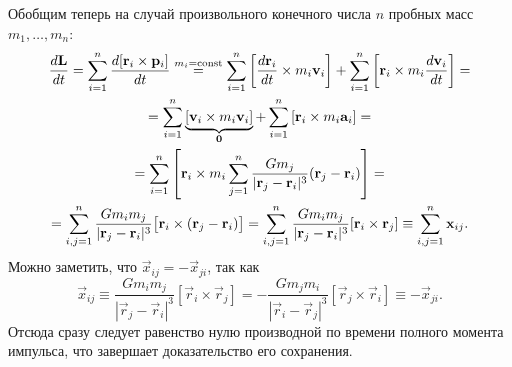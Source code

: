 Обобщим теперь на случай произвольного конечного числа $n$ пробных масс $m_1, \ldots, m_n$:
\begin{multline*}
    \frac{d\mathbf{L}}{dt} =  \sum\limits_{i=1}^n \frac{d[\mathbf{r}_i \times \mathbf{p}_i]}{dt} \overset{m_i=\operatorname{const}}{=} \sum\limits_{i=1}^n \left[\frac{d\mathbf{r}_i}{dt} \times m_i\mathbf{v}_i \right] + \sum\limits_{i=1}^n \left[\mathbf{r}_i \times m_i \frac{d\mathbf{v}_i}{dt} \right] = \\
    = \sum\limits_{i=1}^n \underbrace{\left[\mathbf{v}_i \times m_i\mathbf{v}_i \right]}_{\mathbf{0}} + \sum\limits_{i=1}^n \left[\mathbf{r}_i \times m_i \mathbf{a}_i \right] = \\
    = \sum\limits_{i=1}^n \left[ \mathbf{r}_i \times m_i \sum\limits_{j=1}^n \frac{G m_j}{|\mathbf{r}_j - \mathbf{r}_i|^3} (\mathbf{r}_j - \mathbf{r}_i) \right] = \\
    = \sum\limits_{i,j=1}^n \frac{G m_i m_j}{|\mathbf{r}_j - \mathbf{r}_i|^3} \big[\mathbf{r}_i \times (\mathbf{r}_j - \mathbf{r}_i) \big] = \sum\limits_{i,j=1}^n \frac{G m_i m_j}{|\mathbf{r}_j - \mathbf{r}_i|^3} [\mathbf{r}_i \times \mathbf{r}_j] \equiv \sum\limits_{i,j=1}^n \mathbf{x}_{ij}.
\end{multline*}
Можно заметить, что $\vec{x}_{ij} = -\vec{x}_{ji}$, так как
\begin{equation*}
    \vec{x}_{ij} \equiv \frac{G m_i m_j}{|\vec{r}_j - \vec{r}_i|^3} [\vec{r}_i \times \vec{r}_j] = - \frac{G m_j m_i}{|\vec{r}_i - \vec{r}_j|^3} [\vec{r}_j \times \vec{r}_i] \equiv -\vec{x}_{ji}.
\end{equation*}
Отсюда сразу следует равенство нулю производной по времени полного момента импульса, что завершает доказательство его сохранения.

